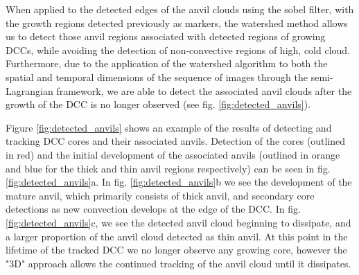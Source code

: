 When applied to the detected edges of the anvil clouds using the sobel filter, with the growth regions detected previously as markers, the watershed method allows us to detect those anvil regions associated with detected regions of growing DCCs, while avoiding the detection of non-convective regions of high, cold cloud.
Furthermore, due to the application of the watershed algorithm to both the spatial and temporal dimensions of the sequence of images through the semi-Lagrangian framework, we are able to detect the associated anvil clouds after the growth of the DCC is no longer observed (see fig. \ref{fig:detected_anvils}).

Figure \ref{fig:detected_anvils} shows an example of the results of detecting and tracking DCC cores and their associated anvils.
Detection of the cores (outlined in red) and the initial development of the associated anvils (outlined in orange and blue for the thick and thin anvil regions respectively) can be seen in fig. \ref{fig:detected_anvils}a.
In fig. \ref{fig:detected_anvils}b we see the development of the mature anvil, which primarily consists of thick anvil, and secondary core detections as new convection develops at the edge of the DCC.
In fig. \ref{fig:detected_anvils}c, we see the detected anvil cloud beginning to dissipate, and a larger proportion of the anvil cloud detected as thin anvil.
At this point in the lifetime of the tracked DCC we no longer observe any growing core, however the "3D" approach allows the continued tracking of the anvil cloud until it dissipates.


